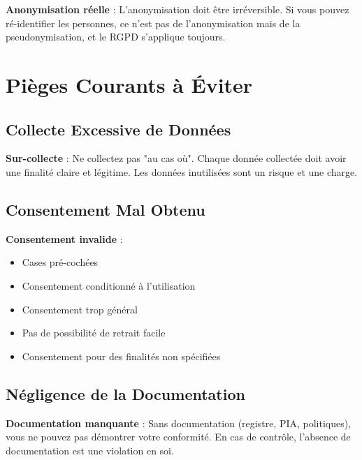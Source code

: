 \documentclass[11pt,a4paper]{article}
\begin{document}
\begin{importantbox}
\textbf{Anonymisation réelle} : L'anonymisation doit être irréversible. Si vous pouvez ré-identifier les personnes, ce n'est pas de l'anonymisation mais de la pseudonymisation, et le RGPD s'applique toujours.
\end{importantbox}

\section{Pièges Courants à Éviter}

\subsection{Collecte Excessive de Données}

\begin{dangerbox}
\textbf{Sur-collecte} : Ne collectez pas "au cas où". Chaque donnée collectée doit avoir une finalité claire et légitime. Les données inutilisées sont un risque et une charge.
\end{dangerbox}

\subsection{Consentement Mal Obtenu}

\begin{dangerbox}
\textbf{Consentement invalide} :
\begin{itemize}
    \item Cases pré-cochées
    \item Consentement conditionné à l'utilisation
    \item Consentement trop général
    \item Pas de possibilité de retrait facile
    \item Consentement pour des finalités non spécifiées
\end{itemize}
\end{dangerbox}

\subsection{Négligence de la Documentation}

\begin{dangerbox}
\textbf{Documentation manquante} : Sans documentation (registre, PIA, politiques), vous ne pouvez pas démontrer votre conformité. En cas de contrôle, l'absence de documentation est une violation en soi.
\end{dangerbox}
\end{document}
